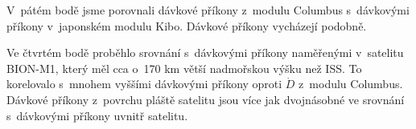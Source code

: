  V~pátém bodě jsme porovnali dávkové příkony z~modulu Columbus s~dávkovými příkony v~japonském modulu Kibo. Dávkové příkony vycházejí podobně.

 Ve čtvrtém bodě proběhlo srovnání s~dávkovými příkony naměřenými v~satelitu BION-M1, který měl cca o~170 km větší nadmořskou výšku než ISS. To korelovalo s~mnohem vyššími dávkovými příkony oproti $\dot{D}$ z~modulu Columbus. Dávkové příkony z~povrchu pláště satelitu jsou více jak dvojnásobné ve srovnání s~dávkovými příkony uvnitř satelitu.



